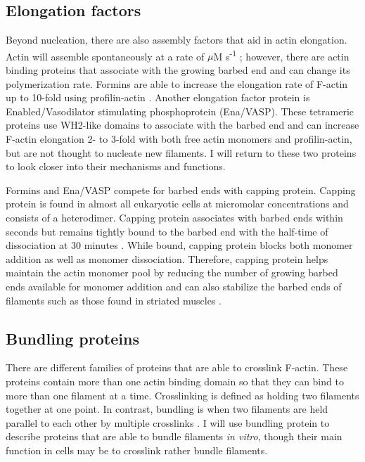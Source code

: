 \subsection{Elongation factors}\label{elongators}
Beyond nucleation, there are also assembly factors that aid in actin elongation. Actin will assemble spontaneously at a rate of  $\mu$M s\textsuperscript{-1} \citep{pollard_rate_1986}; however, there are actin binding proteins that associate with the growing barbed end and can change its polymerization rate. Formins are able to increase the elongation rate of F-actin up to 10-fold using profilin-actin \citep{pollard_actin_2016}. Another elongation factor protein is Enabled/Vasodilator stimulating phosphoprotein (Ena/VASP). These tetrameric proteins use WH2-like domains to associate with the barbed end and can increase F-actin elongation 2- to 3-fold with both free actin monomers and profilin-actin, but are not thought to nucleate new filaments. I will return to these two proteins to look closer into their mechanisms and functions.

Formins and Ena/VASP compete for barbed ends with capping protein. Capping protein is found in almost all eukaryotic cells at micromolar concentrations and consists of a heterodimer. Capping protein associates with barbed ends within seconds but remains tightly bound to the barbed end with the half-time of dissociation at 30 minutes \citep{edwards_capping_2014}. While bound, capping protein blocks both monomer addition as well as monomer dissociation. Therefore, capping protein helps maintain the actin monomer pool by reducing the number of growing barbed ends available for monomer addition and can also stabilize the barbed ends of filaments such as those found in striated muscles \citep{pollard_actin_2016}.  

\subsection{Bundling proteins}\label{bundlers}
There are different families of proteins that are able to crosslink F-actin. These proteins contain more than one actin binding domain so that they can bind to more than one filament at a time. Crosslinking is defined as holding two filaments together at one point. In contrast, bundling is when two filaments are held parallel to each other by multiple crosslinks \citep{pollard_actin_2016}. I will use bundling protein to describe proteins that are able to bundle filaments \textit{in vitro}, though their main function in cells may be to crosslink rather bundle filaments. 

